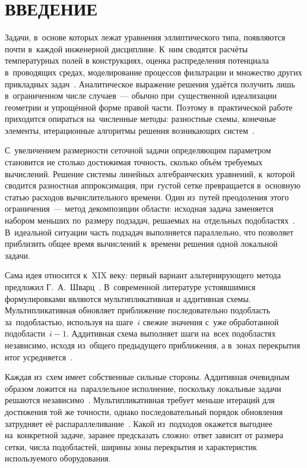 \section*{ВВЕДЕНИЕ}

Задачи, в~основе которых лежат уравнения эллиптического типа, появляются почти
в~каждой инженерной дисциплине. К~ним сводятся расчёты температурных полей в
конструкциях, оценка распределения потенциала в~проводящих средах,
моделирование процессов фильтрации и множество других прикладных
задач~\cite{tihonov1999}. Аналитическое выражение решения удаётся получить
лишь в~ограниченном числе случаев~--- обычно при~существенной идеализации
геометрии и упрощённой форме правой части. Поэтому в~практической работе
приходится опираться на~численные методы: разностные схемы, конечные элементы,
итерационные алгоритмы решения возникающих систем~\cite{samarskii1989}.

С~увеличением размерности сеточной задачи определяющим параметром становится не
столько достижимая точность, сколько объём требуемых вычислений. Решение
системы линейных алгебраических уравнений, к~которой сводится разностная
аппроксимация, при~густой сетке превращается в~основную статью расходов
вычислительного времени. Один из~путей преодоления этого ограничения~--- метод
декомпозиции области: исходная задача заменяется набором меньших по~размеру
подзадач, решаемых на~отдельных подобластях~\cite{toselli2005}. В~идеальной
ситуации часть подзадач выполняется параллельно, что позволяет приблизить общее
время вычислений к~времени решения одной локальной задачи.

Сама идея относится к~XIX веку: первый вариант альтернирующего метода
предложил Г.~А.~Шварц~\cite{schwarz1870}. В~современной литературе устоявшимися
формулировками являются мультипликативная и аддитивная схемы. Мультипликативная
обновляет приближение последовательно подобласть за~подобластью, используя на
шаге~$i$ свежие значения с~уже обработанной подобласти~$i-1$. Аддитивная схема
выполняет шаги на~всех подобластях независимо, исходя из~общего предыдущего
приближения, а в~зонах перекрытия итог усредняется~\cite{quarteroni1999}.

Каждая из~схем имеет собственные сильные стороны. Аддитивная очевидным образом
ложится на~параллельное исполнение, поскольку локальные задачи решаются
независимо~\cite{cai1999}. Мультипликативная требует меньше итераций для
достижения той же точности, однако последовательный порядок обновления
затрудняет её распараллеливание~\cite{ortega1991}. Какой из~подходов окажется
выгоднее на~конкретной задаче, заранее предсказать сложно: ответ зависит от
размера сетки, числа подобластей, ширины зоны перекрытия и характеристик
используемого оборудования.

